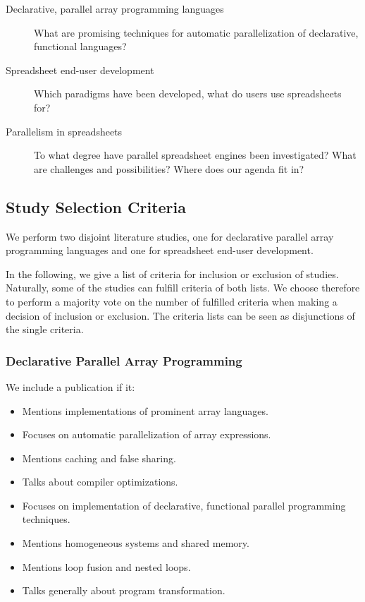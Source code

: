 \documentclass[a4paper]{article}
\begin{document}
\begin{description}
\item[Declarative, parallel array programming languages] What are
  promising techniques for automatic parallelization of declarative,
  functional languages?
\item[Spreadsheet end-user development] Which paradigms have been
  developed, what do users use spreadsheets for?
\item[Parallelism in spreadsheets] To what degree have parallel
  spreadsheet engines been investigated? What are challenges and
  possibilities? Where does our agenda fit in?
\end{description}

\subsection{Study Selection Criteria}
\label{sec:study-select-crit}

We perform two disjoint literature studies, one for declarative parallel array programming languages and one for spreadsheet end-user development.

In the following, we give a list of criteria for inclusion or exclusion of studies. Naturally, some of the studies can fulfill criteria of both lists. We choose therefore to perform a majority vote on the number of fulfilled criteria when making a decision of inclusion or exclusion. The criteria lists can be seen as disjunctions of the single criteria.

\subsubsection{Declarative Parallel Array Programming}

We include a publication if it:

\begin{itemize}
\item Mentions implementations of prominent array languages.
\item Focuses on automatic parallelization of array expressions.
\item Mentions caching and false sharing.
\item Talks about compiler optimizations.
\item Focuses on implementation of declarative, functional parallel
  programming techniques.
\item Mentions homogeneous systems and shared memory.
\item Mentions loop fusion and nested loops.
\item Talks generally about program transformation.
\end{itemize}
\end{document}

